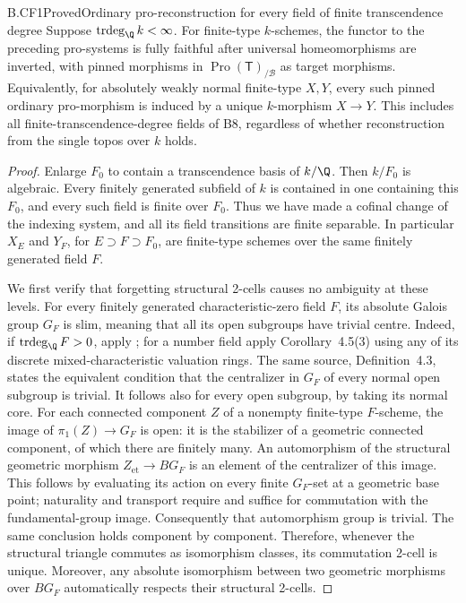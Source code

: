 \begin{claim}{B.CF1}{Proved}{Ordinary pro-reconstruction for every field of finite transcendence degree}
Suppose \(\operatorname{trdeg}_{\Q}k<\infty\). For finite-type
\(k\)-schemes, the functor to the preceding pro-systems is fully faithful
after universal homeomorphisms are inverted, with pinned morphisms in
\(\operatorname{Pro}(\mathsf T)_{/\mathcal B}\) as target morphisms.
Equivalently, for absolutely weakly normal finite-type \(X,Y\), every
such pinned ordinary pro-morphism is induced by a unique \(k\)-morphism
\(X\to Y\). This includes all finite-transcendence-degree fields of B8,
regardless of whether reconstruction from the single topos over \(k\)
holds.
\end{claim}
\begin{proof}
Enlarge \(F_0\) to contain a transcendence basis of \(k/\Q\).
Then \(k/F_0\) is algebraic. Every finitely generated subfield of \(k\)
is contained in one containing this \(F_0\), and every such field is
finite over \(F_0\). Thus we have made a cofinal change of the indexing
system, and all its field transitions are finite separable. In
particular \(X_E\) and \(Y_F\), for \(E\supset F\supset F_0\),
are finite-type schemes over the same finitely generated field \(F\).

We first verify that forgetting structural 2-cells causes no ambiguity
at these levels. For every finitely generated characteristic-zero
field \(F\), its absolute Galois group \(G_F\) is slim, meaning that
all its open subgroups have trivial centre. Indeed, if
\(\operatorname{trdeg}_{\Q}F>0\), apply
\citep[Corollary~4.5(1)]{HoshiTsujimura2023}; for a number field apply
Corollary~4.5(3) using any of its discrete mixed-characteristic valuation
rings. The same source, Definition~4.3, states the equivalent condition
that the centralizer in \(G_F\) of every normal open subgroup is trivial.
It follows also for every open subgroup, by taking its normal core.
For each connected component \(Z\) of a nonempty finite-type
\(F\)-scheme, the image of \(\pi_1(Z)\to G_F\) is open: it is the
stabilizer of a geometric connected component, of which there are
finitely many. An automorphism of the structural geometric morphism
\(Z_{\mathrm{et}}\to BG_F\) is an element of the centralizer of this
image. This follows by evaluating its action on every finite
\(G_F\)-set at a geometric base point; naturality and transport require
and suffice for commutation with the fundamental-group image.
Consequently that automorphism group is trivial. The same conclusion
holds component by component. Therefore, whenever the structural
triangle commutes as isomorphism classes, its commutation 2-cell is
unique. Moreover, any absolute isomorphism between two geometric
morphisms over \(BG_F\) automatically respects their structural 2-cells.


\end{proof}
